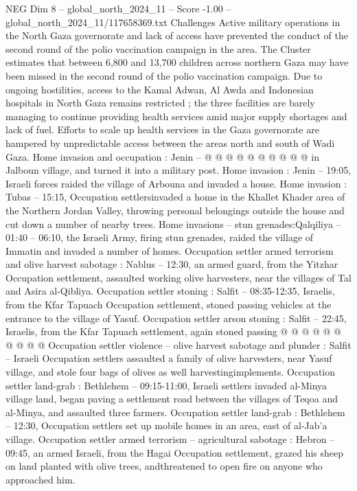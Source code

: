 \begin{textsample}{NEG Dim 8 – global\_north\_2024\_11 – Score -1.00 – global\_north\_2024\_11/117658369.txt}
Challenges Active military operations in the North Gaza governorate and lack of access have prevented the conduct of the second round of the polio vaccination campaign in the area.
The Cluster estimates that between 6,800 and 13,700 children across northern Gaza may have been missed in the second round of the polio vaccination campaign.
Due to ongoing hostilities, access to the Kamal Adwan, Al Awda and Indonesian hospitals in North Gaza remains restricted ; the three facilities are barely managing to continue providing health services amid major supply shortages and lack of fuel.
Efforts to scale up health services in the Gaza governorate are hampered by unpredictable access between the areas north and south of Wadi Gaza.
Home invasion and occupation : Jenin -- @ @ @ @ @ @ @ @ @ @ in Jalboun village, and turned it into a military post.
Home invasion : Jenin -- 19:05, Israeli forces raided the village of Arbouna and invaded a house.
Home invasion : Tubas -- 15:15, Occupation settlersinvaded a home in the Khallet Khader area of the Northern Jordan Valley, throwing personal belongings outside the house and cut down a number of nearby trees.
Home invasions -- stun grenades:Qalqiliya -- 01:40 -- 06:10, the Israeli Army, firing stun grenades, raided the village of Immatin and invaded a number of homes.
Occupation settler armed terrorism and olive harvest sabotage : Nablus -- 12:30, an armed guard, from the Yitzhar Occupation settlement, assaulted working olive harvesters, near the villages of Tal and Asira al-Qibliya.
Occupation settler stoning : Salfit -- 08:35-12:35, Israelis, from the Kfar Tapuach Occupation settlement, stoned passing vehicles at the entrance to the village of Yasuf.
Occupation settler arson stoning : Salfit -- 22:45, Israelis, from the Kfar Tapuach settlement, again stoned passing @ @ @ @ @ @ @ @ @ @ Occupation settler violence -- olive harvest sabotage and plunder : Salfit -- Israeli Occupation settlers assaulted a family of olive harvesters, near Yasuf village, and stole four bags of olives as well harvestingimplements.
Occupation settler land-grab : Bethlehem -- 09:15-11:00, Israeli settlers invaded al-Minya village land, began paving a settlement road between the villages of Teqoa and al-Minya, and assaulted three farmers.
Occupation settler land-grab : Bethlehem -- 12:30, Occupation settlers set up mobile homes in an area, east of al-Jab'a village.
Occupation settler armed terrorism -- agricultural sabotage : Hebron -- 09:45, an armed Israeli, from the Hagai Occupation settlement, grazed his sheep on land planted with olive trees, andthreatened to open fire on anyone who approached him.

\end{textsample}
